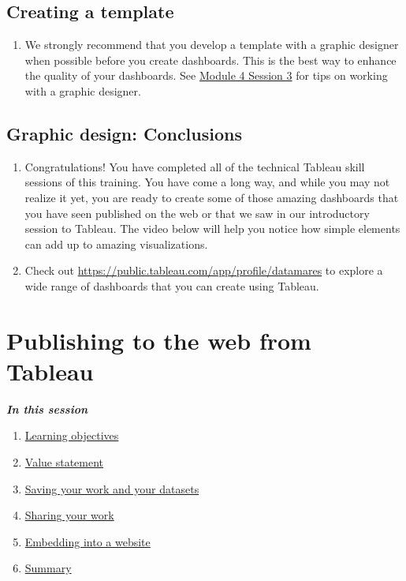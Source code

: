 \documentclass[
]{book}
\providecommand{\tightlist}{%
  \setlength{\itemsep}{0pt}\setlength{\parskip}{0pt}}
\begin{document}
\hypertarget{creating-a-template}{%
\subsection{Creating a template}\label{creating-a-template}}

\begin{enumerate}
\def\labelenumi{\arabic{enumi}.}
\tightlist
\item
  We strongly recommend that you develop a template with a graphic designer when possible before you create dashboards. This is the best way to enhance the quality of your dashboards. See \protect\hyperlink{working-with-graphic-designers}{Module 4 Session 3} for tips on working with a graphic designer.
\end{enumerate}

\hypertarget{graphic-design-conclusions}{%
\subsection{Graphic design: Conclusions}\label{graphic-design-conclusions}}

\begin{enumerate}
\def\labelenumi{\arabic{enumi}.}
\item
  Congratulations! You have completed all of the technical Tableau skill sessions of this training. You have come a long way, and while you may not realize it yet, you are ready to create some of those amazing dashboards that you have seen published on the web or that we saw in our introductory session to Tableau. The video below will help you notice how simple elements can add up to amazing visualizations.\\
\item
  Check out \url{https://public.tableau.com/app/profile/datamares} to explore a wide range of dashboards that you can create using Tableau.
\end{enumerate}

\hypertarget{publishing-to-the-web-from-tableau}{%
\section{Publishing to the web from Tableau}\label{publishing-to-the-web-from-tableau}}

\textbf{\emph{In this session }}

\begin{enumerate}
\def\labelenumi{\arabic{enumi}.}
\tightlist
\item
  \protect\hyperlink{Publishing-to-the-web-learning-objectives}{Learning objectives}
\item
  \protect\hyperlink{Publishing-to-the-web-value-statement}{Value statement}
\item
  \protect\hyperlink{saving-your-work-and-your-datasets}{Saving your work and your datasets}
\item
  \protect\hyperlink{sharing-your-work}{Sharing your work}
\item
  \protect\hyperlink{embedding-into-a-website}{Embedding into a website}
\item
  \protect\hyperlink{publishing-to-the-web-summary}{Summary}
\end{enumerate}
\end{document}
